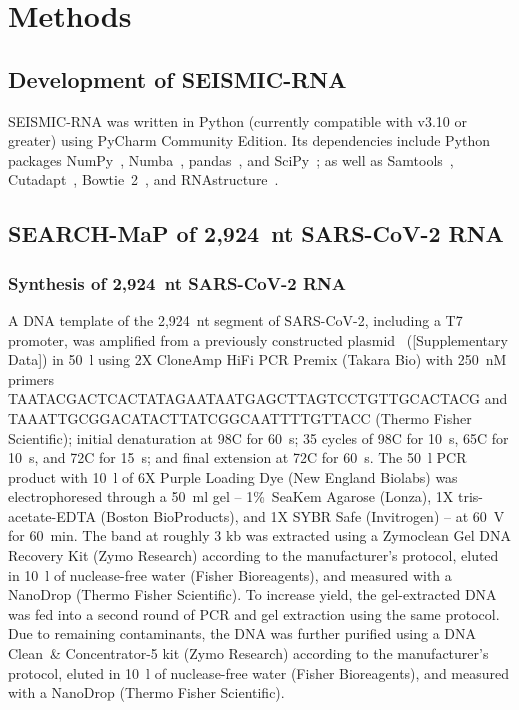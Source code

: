 \documentclass[main.tex]{subfiles}
\begin{document}
\section{Methods}
\label{methods}


\subsection{Development of SEISMIC-RNA}

SEISMIC-RNA was written in Python (currently compatible with v3.10 or greater) using PyCharm Community Edition.
Its dependencies include Python packages NumPy~\cite{Harris2020}, Numba~\cite{Lam2015}, pandas~\cite{McKinney2010}, and SciPy~\cite{Virtanen2020}; as well as Samtools~\cite{Li2009}, Cutadapt~\cite{Martin2011}, Bowtie~2~\cite{Langmead2012}, and RNAstructure~\cite{Reuter2010}.


\subsection{SEARCH-MaP of 2,924~nt SARS-CoV-2 RNA}

\subsubsection{Synthesis of 2,924~nt SARS-CoV-2 RNA}

A DNA template of the 2,924~nt segment of SARS-CoV-2, including a T7 promoter, was amplified from a previously constructed plasmid~\cite{Lan2022} ([Supplementary Data]) in 50~\textmu l using 2X CloneAmp HiFi PCR Premix (Takara Bio) with 250~nM primers TAATACGACTCACTATAGAATAATGAGCTTAGTCCTGTTGCACTACG and TAAATTGCGGACATACTTATCGGCAATTTTGTTACC (Thermo Fisher Scientific); initial denaturation at 98\textdegree C for 60~s; 35 cycles of 98\textdegree C for 10~s, 65\textdegree C for 10~s, and 72\textdegree C for 15~s; and final extension at 72\textdegree C for 60~s.
The 50~\textmu l PCR product with 10~\textmu l of 6X Purple Loading Dye (New England Biolabs) was electrophoresed through a 50~ml gel -- 1\%~SeaKem Agarose (Lonza), 1X tris-acetate-EDTA (Boston BioProducts), and 1X SYBR Safe (Invitrogen) -- at 60~V for 60~min.
The band at roughly 3 kb was extracted using a Zymoclean Gel DNA Recovery Kit (Zymo Research) according to the manufacturer's protocol, eluted in 10~\textmu l of nuclease-free water (Fisher Bioreagents), and measured with a NanoDrop (Thermo Fisher Scientific).
To increase yield, the gel-extracted DNA was fed into a second round of PCR and gel extraction using the same protocol.
Due to remaining contaminants, the DNA was further purified using a DNA Clean~\& Concentrator-5 kit (Zymo Research) according to the manufacturer's protocol, eluted in 10~\textmu l of nuclease-free water (Fisher Bioreagents), and measured with a NanoDrop (Thermo Fisher Scientific).
\end{document}
